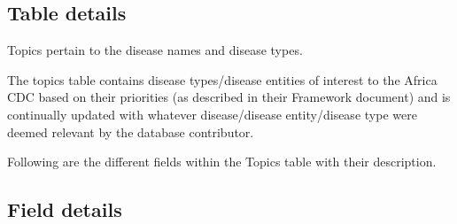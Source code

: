 \documentclass[
]{book}
\begin{document}
\hypertarget{table-details-8}{%
\subsection{Table details}\label{table-details-8}}

Topics pertain to the disease names and disease types.

The topics table contains disease types/disease entities of interest to the Africa CDC based on their priorities (as described in their Framework document) and is continually updated with whatever disease/disease entity/disease type were deemed relevant by the database contributor.

Following are the different fields within the Topics table with their description.

\hypertarget{field-details-6}{%
\subsection{Field details}\label{field-details-6}}
\end{document}
